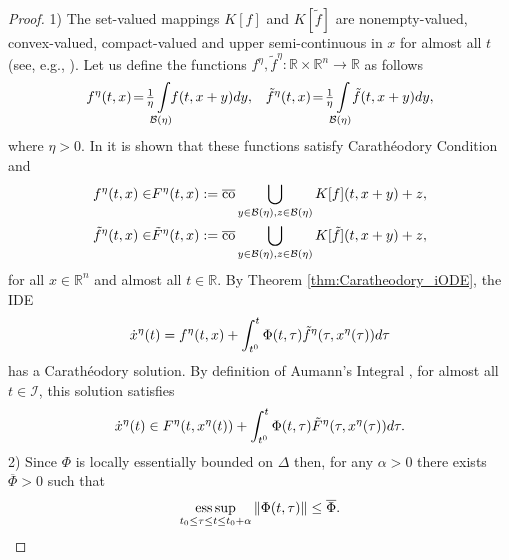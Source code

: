 \documentclass{article}
\newcommand{\R}{\mathbb{R}}
\newcommand{\co}{\mathrm{co}}
\DeclareMathOperator*{\esssup}{ess\,sup}
\begin{document}
\begin{proof}  1) The set-valued mappings $K[f]$ and $K[\tilde f]$  are  nonempty-valued, convex-valued, compact-valued and upper semi-continuous  in $x$ for almost all $t$ (see, e.g., \cite[page 85]{Filippov1988:Book}).
Let us define the functions 
$f^{\eta},\tilde f^{\eta}:\R\times \R^{n}\to \R$  as follows\vspace{-1mm}
\[
	f^{\eta}(t,x)\!=\!\tfrac{1}{\eta}\!\!
	\int\limits_{\mathcal{B}(\eta)} \!\!\!f(t,x+y) dy, \;\;\;
	\tilde f^{\eta}(t,x)\!=\!\tfrac{1}{\eta}\!\!
	\int\limits_{\mathcal{B}(\eta)} \!\!\tilde f(t,x+y) dy,\vspace{-1mm}
\] 
where $\eta>0$.
In  \cite[Theroem 8, page 85]{Filippov1988:Book} it is shown that these functions satisfy Carath\'{e}odory Condition
and \vspace{-1mm}
\[
\begin{split}
	f^{\eta}(t,x)\in&F^{\eta}(t,x):=\overline{\co} \bigcup_{y\in \mathcal{B}(\eta),z\in \mathcal{B}(\eta)}K[f](t,x+y)+z,  \\
	\tilde f^{\eta}(t,x)\in &\tilde F^{\eta}(t,x):=\overline{\co} \bigcup_{y\in \mathcal{B}(\eta),z\in \mathcal{B}(\eta)}K[\tilde f](t,x+y)+z,  \\ 
\end{split} \vspace{-1mm}
\] 
for all $x\in \R^n$ and almost all $t\in \R$. 
By Theorem \ref{thm:Caratheodory_iODE}, the IDE\vspace{-1mm}
\begin{equation}\label{eq:IDE_eta}
\dot x^{\eta}(t)=f^{\eta}(t,x)+\int^t_{t^0} \Phi(t,\tau) \tilde f^{\eta}(\tau,x^{\eta}(\tau)) d\tau\vspace{-1mm}
\end{equation}
has a Carath\'{e}odory solution.  {By definition of Aumann's Integral \cite{Aumann1965:JMAA}, for almost all $t\in\mathcal{I}$}, this solution satisfies \vspace{-1mm}
\begin{equation}\label{eq:IDI_eta}
\dot x^{\eta}(t)\in F^{\eta}(t,x^{\eta}(t))+\int^t_{t^0} \Phi(t,\tau) \tilde F^{\eta}(\tau,x^{\eta}(\tau)) d\tau.\vspace{-1mm}
\end{equation}
2) 
Since $\Phi$ is locally essentially bounded on $\Delta$ then, for any $\alpha>0$ there exists $ \overline{\Phi}>0$ such that \vspace{-1mm}
\[
\esssup_{t_0\leq \tau\leq t\leq t_0+\alpha}\|\Phi(t,\tau)\|\leq \overline{\Phi}.\vspace{-1mm}
\]
\end{proof}
\end{document}
